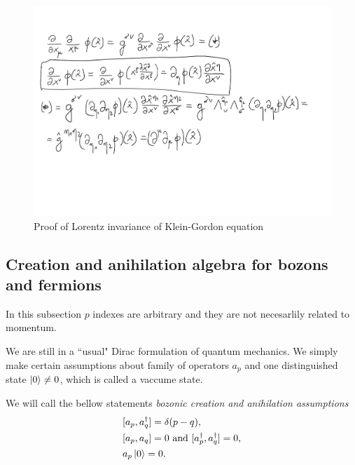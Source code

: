 \documentclass[main.tex]{subfiles}
\begin{document}
\begin{figure}[H]
\label{klein-proof}
\includegraphics[scale=0.5]{figs/KleinInvariance}
\caption{Proof of Lorentz invariance of Klein-Gordon equation}
\end{figure}
\subsection{Creation and anihilation algebra for bozons and fermions}
In this subsection $p$ indexes are arbitrary and they are not necesarlily related to momentum. 

We are still in a ``usual" Dirac formulation of quantum mechanics. We simply make certain assumptions about family of operators $a_p$ and one distinguished state    $\ket{0} \not= 0$, which is called a vaccume state.

\begin{definition}
We will call the bellow statements \textit{bozonic creation and anihilation assumptions}
\begin{align}
& [a_p, a^\dagger_q] = \delta(p - q),\\
& [a_p, a_q] = 0 \text{ and } [a^\dagger_p, a^\dagger_q] = 0,\\
& a_p\ket{0} = 0.
\end{align}
\end{definition}
\end{document}
